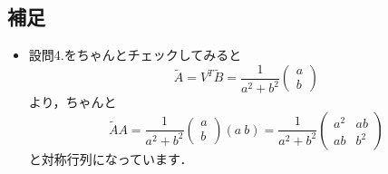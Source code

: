 \documentclass[a4paper,pdflatex,ja=standard]{bxjsarticle}
\begin{document}
\subsection*{補足}
\begin{itemize}
  \item 
  設問4.をちゃんとチェックしてみると
  \begin{equation}
    \tilde{A}
    =
    V^{T}\tilde{B}
    =
    \frac{1}{a^{2}+b^{2}}
    \begin{pmatrix}
      a \\
      b
    \end{pmatrix}
  \end{equation}
  より，ちゃんと
  \begin{equation}
    \tilde{A}A
    =
    \frac{1}{a^{2}+b^{2}}
    \begin{pmatrix}
      a \\
      b
    \end{pmatrix}
    (a\ b)
    =
    \frac{1}{a^{2}+b^{2}}
    \begin{pmatrix}
      a^2 & ab \\
      ab & b^2
    \end{pmatrix}
  \end{equation}
  と対称行列になっています．


\end{itemize}
\end{document}
